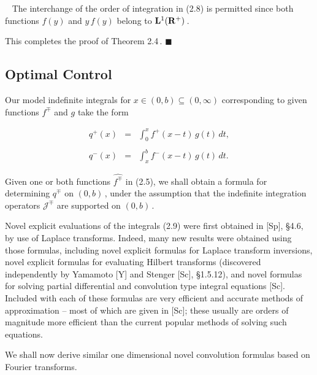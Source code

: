 \documentclass[11pt]{article}
\newenvironment{Proof}
{\bigskip\noindent{\bf Proof.}~\rm}{\bigskip}
\begin{document}
\begin{Proof}
 \noindent The interchange of the order of integration in (2.8) is permitted
 since both functions $f(y)$ and $y\,f(y)$ belong to ${\bf
   L}^1({\mathbf R}^+)$\,.  

\vspace{.1in} \noindent This completes the proof of Theorem 2.4\,.
\end{Proof} $\blacksquare$

\subsection{Optimal Control}%

Our model indefinite integrals for $x \in (0,b) \subseteq
(0,\infty)$ corresponding to given functions $f^\mp$ and $g$ take the
form

 \begin{equation}%
 \begin{array}{rcl}
   q^+(x) & = & \displaystyle  \int_0^x f^+(x-t)\,g(t)\,dt, \\
   && \\
   q^-(x) & = & \displaystyle  \int_x^b f^-(x-t)\,g(t)\,dt.
 \end{array}
 \label{equation:2.9}
 \end{equation}

\noindent Given one or both functions $\widehat{f^\mp}$ in (2.5), we shall 
obtain a formula for determining $q^\mp$ on $(0,b)$\,, under the
assumption that the indefinite integration operators ${\mathcal
  J}^\mp$ are supported on $(0,b)$\,. 

\vspace{.1in} \noindent Novel explicit evaluations of the integrals
(2.9) were first obtained in [Sp], \S4.6, by use of Laplace
transforms.  Indeed, many new results were obtained using those
formulas, including novel explicit formulas for Laplace transform
inversions, novel explicit formulas for evaluating Hilbert transforms
(discovered independently by Yamamoto [Y] and Stenger [Sc], \S1.5.12),
and novel formulas for solving partial differential and convolution
type integral equations [Sc].  Included with each of these formulas
are very efficient and accurate methods of approximation -- most of
which are given in [Sc]; these usually are orders of magnitude more
efficient than the current popular methods of solving such equations.

\vspace{.1in} \noindent We shall now derive similar one dimensional
novel convolution formulas based on Fourier transforms.
\end{document}
